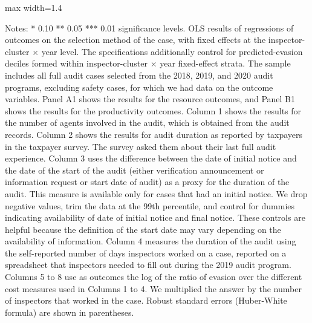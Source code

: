 \documentclass{article}
\newcommand{\OutPath}{Output/}%
\newcommand{\OutPath}{../Output/}%
\begin{document}
\begin{landscape}
\begin{table}[H]
\begin{adjustbox}{max width=1.4\textwidth}
\begin{threeparttable}
\footnotesize


\begin{tablenotes}[flushleft]
\footnotesize
\item Notes: * 0.10 ** 0.05 *** 0.01 significance levels. OLS results of regressions of outcomes on the selection method of the case, with fixed effects at the inspector-cluster $\times$ year level. The specifications additionally control for predicted-evasion deciles formed within inspector-cluster $\times$ year fixed-effect strata. The sample includes all full audit cases selected from the 2018, 2019, and 2020 audit programs, excluding safety cases, for which we had data on the outcome variables. Panel A1 shows the results for the resource outcomes, and Panel B1 shows the results for the productivity outcomes. Column 1 shows the results for the number of agents involved in the audit, which is obtained from the audit records. Column 2 shows the results for audit duration as reported by taxpayers in the taxpayer survey. The survey asked them about their last full audit experience. Column 3 uses the difference between the date of initial notice and the date of the start of the audit (either verification announcement or information request or start date of audit) as a proxy for the duration of the audit. This measure is available only for cases that had an initial notice. We drop negative values, trim the data at the 99th percentile, and control for dummies indicating availability of date of initial notice and final notice. These controls are helpful because the definition of the start date may vary depending on the availability of information. Column 4 measures the duration of the audit using the self-reported number of days inspectors worked on a case, reported on a spreadsheet that inspectors needed to fill out during the 2019 audit program. Columns 5 to 8 use as outcomes the log of the ratio of evasion over the different cost measures used in Columns 1 to 4. We multiplied the answer by the number of inspectors that worked in the case. Robust standard errors (Huber-White formula) are shown in parentheses.
\end{tablenotes}
\end{threeparttable}
\end{adjustbox}
\end{table}



\end{landscape}
\end{document}
